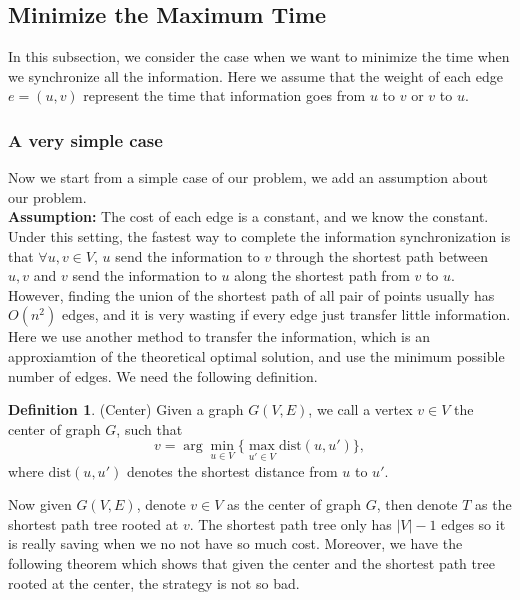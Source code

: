 \documentclass{article}
\theoremstyle{plain}
\theoremstyle{definition}
\newtheorem{defn}{Definition}[section]
\theoremstyle{remark}
\begin{document}
    \subsection{Minimize the Maximum Time}
    In this subsection, we consider the case when we want to minimize the time when we synchronize all the information. Here we assume that the weight of each edge $e = (u,v)$ represent the time that information goes from $u$ to $v$ or $v$ to $u$.

    \subsubsection{A very simple case}
    Now we start from a simple case of our problem, we add an assumption about our problem.\\
    
    \textbf{Assumption:} The cost of each edge is a constant, and we know the constant.\\
    
    Under this setting, the fastest way to complete the information synchronization is that $\forall u,v\in V$, $u$ send the information to $v$ through the shortest path between $u,v$ and $v$ send the information to $u$ along the shortest path from $v$ to $u$. However, finding the union of the shortest path of all pair of points usually has $O(n^2)$ edges, and it is very wasting if every edge just transfer little information.\\

    Here we use another method to transfer the information, which is an approxiamtion of the theoretical optimal solution, and use the minimum possible number of edges. We need the following definition.

    \begin{defn}\label{center}
        (Center) Given a graph $G(V,E)$, we call a vertex $v\in V$ the center of graph $G$, such that
        \[v = \arg\min_{u\in V}\{\max_{u'\in V}\text{dist}(u,u')\},\]
        where $\text{dist}(u,u')$ denotes the shortest distance from $u$ to $u'$.
    \end{defn}

    Now given $G(V,E)$, denote $v\in V$ as the center of graph $G$, then denote $T$ as the shortest path tree rooted at $v$. The shortest path tree only has $|V|-1$ edges so it is really saving when we no not have so much cost. Moreover, we have the following theorem which shows that given the center and the shortest path tree rooted at the center, the strategy is not so bad.
\end{document}
